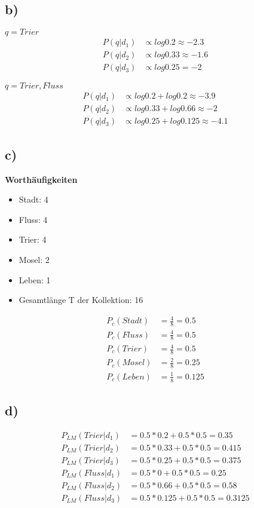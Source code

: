 \documentclass[11pt,a4paper,parskip=half ]{scrartcl}
\begin{document}
	
	\subsection*{b)}
	
	$q = {Trier}$
	\begin{align*}
	P(q|d_1) &\propto log 0.2 \approx -2.3\\
	P(q|d_2) &\propto log 0.33 \approx -1.6\\
	P(q|d_3) &\propto log 0.25 = -2
	\end{align*}
	
	$q= {Trier, Fluss}$
	\begin{align*}
	P(q|d_1) &\propto log 0.2 + log 0.2 \approx -3.9\\
	P(q|d_2) &\propto log 0.33 + log 0.66 \approx -2\\
	P(q|d_3) &\propto log 0.25 + log 0.125 \approx -4.1
	\end{align*}
	
	\subsection*{c)}
	
	\textbf{Worthäufigkeiten}
	\begin{itemize}
		\item Stadt: 4
		\item Fluss: 4
		\item Trier: 4
		\item Mosel: 2
		\item Leben: 1
		\item Gesamtlänge T der Kollektion: 16
	\end{itemize}
	
	
	\begin{align*}
	P_c(Stadt) &= \frac{4}{8} = 0.5\\
	P_c(Fluss) &= \frac{4}{8} = 0.5\\
	P_c(Trier) &= \frac{4}{8} = 0.5\\
	P_c(Mosel) &= \frac{2}{8} = 0.25\\
	P_c(Leben) &= \frac{1}{8} = 0.125
	\end{align*}
	
	\subsection*{d)}
	
	\begin{align*}
	P_{LM}(Trier|d_1) &= 0.5*0.2 + 0.5*0.5  = 0.35\\
	P_{LM}(Trier|d_2) &= 0.5*0.33 + 0.5*0.5 = 0.415\\
	P_{LM}(Trier|d_3) &= 0.5*0.25 + 0.5*0.5 = 0.375 \\
	P_{LM}(Fluss|d_1) &= 0.5*0 + 0.5*0.5  = 0.25\\
	P_{LM}(Fluss|d_2) &= 0.5*0.66 + 0.5*0.5 =  0.58\\
	P_{LM}(Fluss|d_3) &= 0.5*0.125 + 0.5*0.5 = 0.3125
	\end{align*}
	
\end{document}
